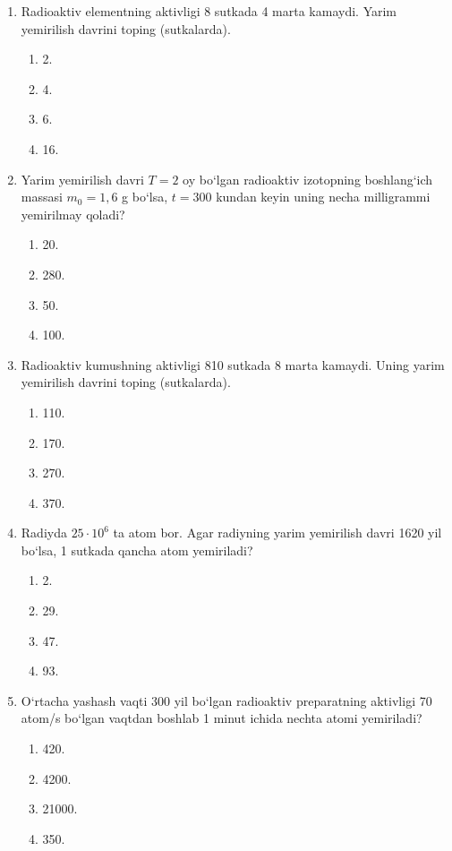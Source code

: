\begin{enumerate}
\item Radioaktiv elementning aktivligi 8 sutkada 4 marta kamaydi. Yarim yemirilish davrini toping (sutkalarda).
\begin{enumerate}[label=\Alph*)]
\item 2.
\item 4.
\item 6.
\item 16.
\end{enumerate}

\item Yarim yemirilish davri $T=2$ oy bo‘lgan radioaktiv izotopning boshlang‘ich massasi $m_0=1,6$ g bo‘lsa, $t=300$ kundan keyin uning necha milligrammi yemirilmay qoladi?
\begin{enumerate}[label=\Alph*)]
\item 20.
\item 280.
\item 50.
\item 100.
\end{enumerate}

\item Radioaktiv kumushning aktivligi 810 sutkada 8 marta kamaydi. Uning yarim yemirilish davrini toping (sutkalarda).
\begin{enumerate}[label=\Alph*)]
\item 110.
\item 170.
\item 270.
\item 370.
\end{enumerate}

\item Radiyda $25\cdot 10^6$ ta atom bor. Agar radiyning yarim yemirilish davri 1620 yil bo‘lsa, 1 sutkada qancha atom yemiriladi?
\begin{enumerate}[label=\Alph*)]
\item 2.
\item 29.
\item 47.
\item 93.
\end{enumerate}

\item O‘rtacha yashash vaqti 300 yil bo‘lgan radioaktiv preparatning aktivligi 70 atom/s bo‘lgan vaqtdan boshlab 1 minut ichida nechta atomi yemiriladi?
\begin{enumerate}[label=\Alph*)]
\item 420.
\item 4200.
\item 21000.
\item 350.
\end{enumerate}


\end{enumerate}
